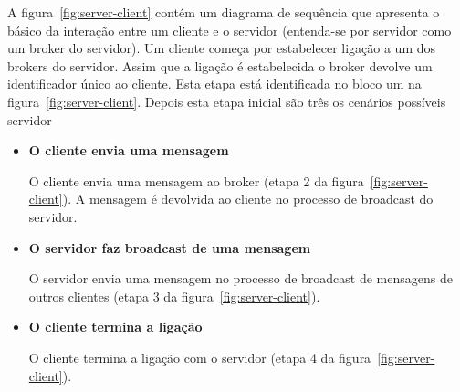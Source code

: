 A figura~\ref{fig:server-client} contém um diagrama de sequência que apresenta o básico da interação entre um cliente e o servidor (entenda-se por servidor como um broker do servidor).
Um cliente começa por estabelecer ligação a um dos brokers do servidor. Assim que a ligação é estabelecida o broker devolve um identificador único ao cliente. Esta etapa está identificada no bloco um na figura~\ref{fig:server-client}. Depois esta etapa inicial são três os cenários possíveis servidor

\begin{itemize}
\item
\textbf{O cliente envia uma mensagem}

O cliente envia uma mensagem ao broker (etapa 2 da figura~\ref{fig:server-client}). A mensagem é devolvida ao cliente no processo de broadcast do servidor.

\item
\textbf{O servidor faz broadcast de uma mensagem}

O servidor envia uma mensagem no processo de broadcast de mensagens de outros clientes (etapa 3 da figura~\ref{fig:server-client}).

\item
\textbf{O cliente termina a ligação}

O cliente termina a ligação com o servidor (etapa 4 da figura~\ref{fig:server-client}).
\end{itemize}

